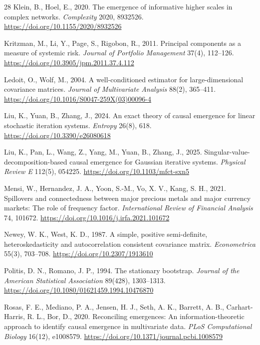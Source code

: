 \documentclass[12pt]{article}
\begin{document}
\begin{thebibliography}{28}
Klein, B., Hoel, E., 2020.
\newblock The emergence of informative higher scales in complex networks.
\newblock \emph{Complexity} 2020, 8932526. \url{https://doi.org/10.1155/2020/8932526}

Kritzman, M., Li, Y., Page, S., Rigobon, R., 2011.
\newblock Principal components as a measure of systemic risk.
\newblock \emph{Journal of Portfolio Management} 37(4), 112--126. \url{https://doi.org/10.3905/jpm.2011.37.4.112}

Ledoit, O., Wolf, M., 2004.
\newblock A well-conditioned estimator for large-dimensional covariance matrices.
\newblock \emph{Journal of Multivariate Analysis} 88(2), 365--411. \url{https://doi.org/10.1016/S0047-259X(03)00096-4}

Liu, K., Yuan, B., Zhang, J., 2024.
\newblock An exact theory of causal emergence for linear stochastic iteration systems.
\newblock \emph{Entropy} 26(8), 618. \url{https://doi.org/10.3390/e26080618}

Liu, K., Pan, L., Wang, Z., Yang, M., Yuan, B., Zhang, J., 2025.
\newblock Singular-value-decomposition-based causal emergence for Gaussian iterative systems.
\newblock \emph{Physical Review E} 112(5), 054225. \url{https://doi.org/10.1103/mfct-sxn5}

Mensi, W., Hernandez, J. A., Yoon, S.-M., Vo, X. V., Kang, S. H., 2021.
\newblock Spillovers and connectedness between major precious metals and major currency markets: The role of frequency factor.
\newblock \emph{International Review of Financial Analysis} 74, 101672. \url{https://doi.org/10.1016/j.irfa.2021.101672}

Newey, W. K., West, K. D., 1987.
\newblock A simple, positive semi-definite, heteroskedasticity and autocorrelation consistent covariance matrix.
\newblock \emph{Econometrica} 55(3), 703--708. \url{https://doi.org/10.2307/1913610}

Politis, D. N., Romano, J. P., 1994.
\newblock The stationary bootstrap.
\newblock \emph{Journal of the American Statistical Association} 89(428), 1303--1313. \url{https://doi.org/10.1080/01621459.1994.10476870}

Rosas, F. E., Mediano, P. A., Jensen, H. J., Seth, A. K., Barrett, A. B., Carhart-Harris, R. L., Bor, D., 2020.
\newblock Reconciling emergences: An information-theoretic approach to identify causal emergence in multivariate data.
\newblock \emph{PLoS Computational Biology} 16(12), e1008579. \url{https://doi.org/10.1371/journal.pcbi.1008579}


\end{thebibliography}
\end{document}

